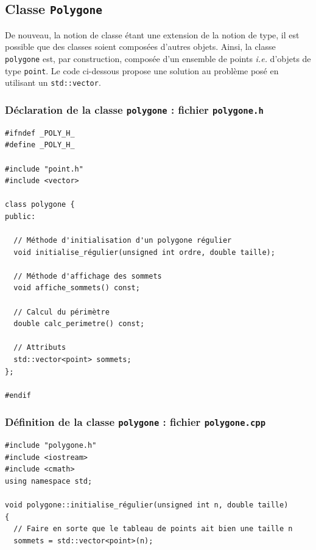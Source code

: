 \documentclass{book}
\newcommand{\inline}[1]{\texttt{#1}}
\begin{document}
\begin{correction}

\subsection*{Classe \texttt{Polygone}}

De nouveau, la notion de classe étant une extension de la notion de type, il est
possible que des classes soient composées d'autres objets. Ainsi, la classe
\texttt{polygone} est, par construction, composée d'un ensemble de points \emph{i.e.} d'objets
de type \texttt{point}. Le code ci-dessous propose une solution au problème posé en
utilisant un \inline{std::vector}.

\subsubsection*{Déclaration de la classe \texttt{polygone} : fichier \texttt{polygone.h}}

\begin{verbatim}
#ifndef _POLY_H_
#define _POLY_H_

#include "point.h"
#include <vector>

class polygone {
public:

  // Méthode d'initialisation d'un polygone régulier
  void initialise_régulier(unsigned int ordre, double taille);

  // Méthode d'affichage des sommets
  void affiche_sommets() const;

  // Calcul du périmètre
  double calc_perimetre() const;

  // Attributs
  std::vector<point> sommets;
};

#endif
\end{verbatim}

\subsubsection*{Définition de la classe \texttt{polygone} : fichier \texttt{polygone.cpp}}

\begin{verbatim}
#include "polygone.h"
#include <iostream>
#include <cmath>
using namespace std;

void polygone::initialise_régulier(unsigned int n, double taille)
{
  // Faire en sorte que le tableau de points ait bien une taille n
  sommets = std::vector<point>(n);


\end{verbatim}
\end{correction}
\end{document}
